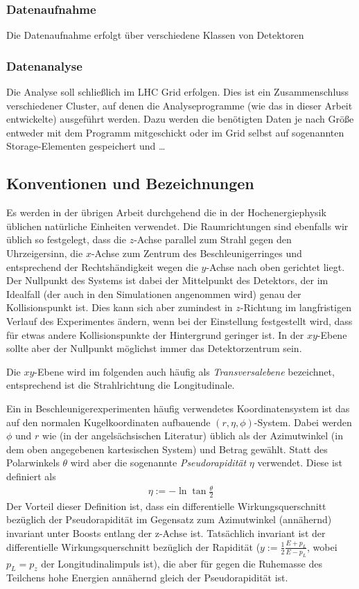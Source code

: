 \subsubsection{Datenaufnahme}
\label{cha:aufnahme}
Die Datenaufnahme erfolgt über verschiedene Klassen von Detektoren
\subsubsection{Datenanalyse}
Die Analyse soll schließlich im LHC Grid erfolgen. Dies ist ein Zusammenschluss
verschiedener Cluster, auf denen die Analyseprogramme (wie das in dieser Arbeit
entwickelte) ausgeführt werden. Dazu werden die benötigten Daten je nach Größe
entweder mit dem Programm mitgeschickt oder im Grid selbst auf sogenannten
Storage-Elementen gespeichert und \dots

\subsection{Konventionen und Bezeichnungen}
\label{cha:conv}
Es werden in der übrigen Arbeit durchgehend die in der Hochenergiephysik
üblichen natürliche Einheiten verwendet. Die Raumrichtungen sind ebenfalls wir
üblich so festgelegt, dass die $z$-Achse parallel zum Strahl gegen den
Uhrzeigersinn, die $x$-Achse zum Zentrum des Beschleunigerringes und entsprechend
der Rechtshändigkeit wegen die $y$-Achse nach oben gerichtet liegt. Der Nullpunkt
des Systems ist dabei der Mittelpunkt des Detektors, der im Idealfall (der auch
in den Simulationen angenommen wird) genau der Kollisionspunkt ist.  Dies kann
sich aber zumindest in $z$-Richtung im langfristigen Verlauf des Experimentes
ändern, wenn bei der Einstellung festgestellt wird, dass für etwas andere
Kollisionspunkte der Hintergrund geringer ist. In der $xy$-Ebene sollte aber der
Nullpunkt möglichst immer das Detektorzentrum sein.

Die $xy$-Ebene wird im folgenden auch häufig als \emph{Transversalebene}
bezeichnet, entsprechend ist die Strahlrichtung die Longitudinale.

Ein in Beschleunigerexperimenten häufig verwendetes Koordinatensystem ist das
auf den normalen Kugelkoordinaten aufbauende $(r, \eta, \phi)$-System.  Dabei
werden $\phi$ und $r$ wie (in der angelsächsischen Literatur) üblich als der
Azimutwinkel (in dem oben angegebenen kartesischen System) und Betrag gewählt.
Statt des Polarwinkels $\theta$ wird aber die sogenannte \emph{Pseudorapidität}
$\eta$ verwendet. Diese ist definiert als
\begin{align}
  \eta := -\ln{\tan{\frac \theta 2}}
\end{align}
Der Vorteil dieser Definition ist, dass ein differentielle Wirkungsquerschnitt
bezüglich der Pseudorapidität im Gegensatz zum Azimutwinkel (annähernd)
invariant unter Boosts entlang der z-Achse ist.  Tatsächlich invariant ist der
differentielle Wirkungsquerschnitt bezüglich der Rapidität ($y := \frac12
\frac{E + p_L}{E - p_L}$, wobei $p_L = p_z$ der Longitudinalimpuls ist), die
aber für gegen die Ruhemasse des Teilchens hohe Energien annähernd gleich der
Pseudorapidität ist.


